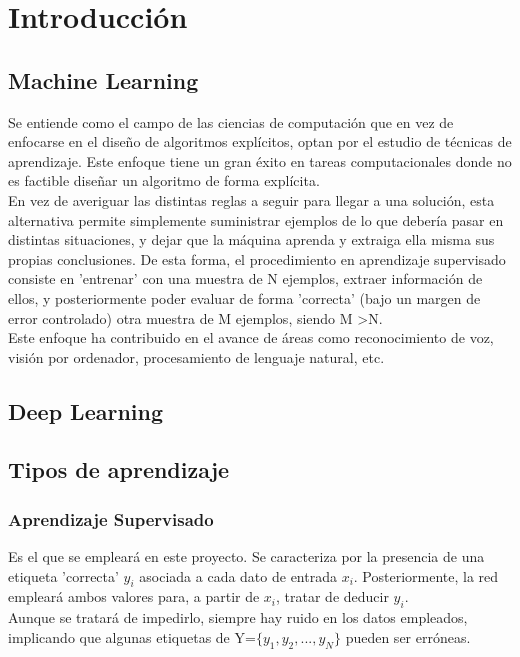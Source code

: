 \chapter{Introducción}

\section{Machine Learning}

Se entiende como el campo de las ciencias de computación que en vez de enfocarse en el diseño de algoritmos explícitos, optan por el estudio de técnicas de aprendizaje. Este enfoque tiene un gran éxito en tareas computacionales donde no es factible diseñar un algoritmo de forma explícita. \cite{Programming_Massively} \\
En vez de averiguar las distintas reglas a seguir para llegar a una solución, esta alternativa permite simplemente suministrar ejemplos de lo que debería pasar en distintas situaciones, y dejar que la máquina aprenda y extraiga ella misma sus propias conclusiones. De esta forma, el procedimiento en aprendizaje supervisado consiste en 'entrenar' con una muestra de N ejemplos, extraer información de ellos, y posteriormente poder evaluar de forma 'correcta' (bajo un margen de error controlado) otra muestra de M ejemplos, siendo M \textgreater N. \cite{Learning_From_Data} \\
Este enfoque ha contribuido en el avance de áreas como reconocimiento de voz, visión por ordenador, procesamiento de lenguaje natural, etc.


\section{Deep Learning}

\section{Tipos de aprendizaje}


\subsection{Aprendizaje Supervisado}


Es el que se empleará en este proyecto. 
Se caracteriza por la presencia de una etiqueta 'correcta' $y_i$ asociada a cada dato de entrada $x_i$. Posteriormente, la red empleará ambos valores para, a partir de $x_i$, tratar de deducir $y_i$. \cite{Learning_From_Data} \\
Aunque se tratará de impedirlo, siempre hay ruido en los datos empleados, implicando que algunas etiquetas de Y=$\{y_1, y_2, ..., y_N\}$ pueden ser erróneas. \\

